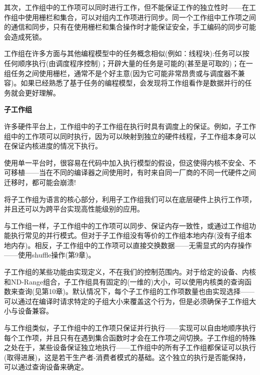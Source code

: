 其次，工作组中的工作项可以同时进行工作，但不能保证工作的独立性时——在工作组中使用栅栏和集合，可以对组内工作项进行同步。同一个工作组中工作项之间的通信和同步，只有在使用栅栏和集合操作时才能保证安全，手工编码的同步可能会造成死锁。\par

\begin{tcolorbox}[colback=blue!5!white,colframe=blue!75!black, title=对于工作组的思考]
工作组在许多方面与其他编程模型中的任务概念相似(例如：线程块):任务可以按任何顺序执行(由调度程序控制)；开辟大量的任务是可能的(甚至是可取的)；在一组任务之间使用栅栏，通常不是个好主意(因为它可能非常昂贵或与调度器不兼容)。如果已经熟悉了基于任务的编程模型，会发现将工作组看作是数据并行的任务就会更好理解。
\end{tcolorbox}

\hspace*{\fill} \par %
\textbf{子工作组}

许多硬件平台上，工作组中的子工作组在执行时具有调度上的保证。例如，子工作组中的工作项可以同时执行，因为可以映射到独立的硬件线程，子工作组本身可以在保证内核进度的情况下执行。\par

使用单一平台时，很容易在代码中加入执行模型的假设，但这使得内核不安全、不可移植——当在不同的编译器之间使用时，有时来自同一厂商的不同一代硬件之间迁移时，都可能会崩溃!\par

将子工作组为语言的核心部分，利用子工作组我们可以在底层硬件上执行工作项，并且还可以为跨平台实现高性能级别的应用。\par

与工作组一样，子工作组中的工作项可以同步、保证内存一致性，或通过工作组功能执行常见的并行模式。但对于子工作组没有等价的工作组本地内存(没有子组本地内存)。相反，子工作组中的工作项可以直接交换数据——无需显式的内存操作——使用shuffle操作(第9章)。\par

子工作组的某些功能由实现定义，不在我们的控制范围内。对于给定的设备、内核和ND-Range组合，子工作组具有固定的(一维的)大小，可以使用内核类的查询函数来查询(见第10章)。默认情况下，每个子工作组的工作项数量也由实现选择——可以通过在编译时请求特定的子组大小来覆盖这个行为，但是必须确保子工作组大小与设备兼容。\par

与工作组类似，子工作组中的工作项只保证并行执行——实现可以自由地顺序执行每个工作项，并且只有在遇到集合函数时才会在工作项之间切换。子工作组的特殊之处在于，某些设备保证独立地执行——工作组中的所有子工作组都保证可以执行(取得进展)，这是若干生产者-消费者模式的基础。这个独立的执行是否能保持，可以通过查询设备来确定。\par

